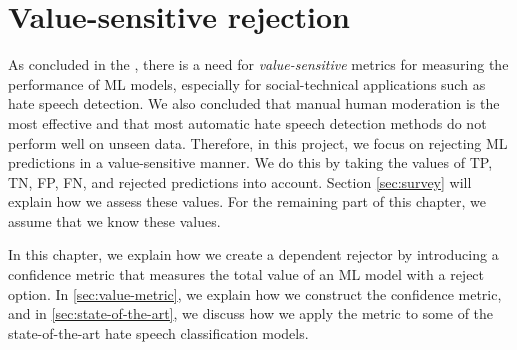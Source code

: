 \chapter{Value-sensitive rejection}
As concluded in the , there is a need for \textit{value-sensitive} metrics for measuring the performance of ML models, especially for social-technical applications such as hate speech detection.
%
We also concluded that manual human moderation is the most effective and that most automatic hate speech detection methods do not perform well on unseen data.
%
Therefore, in this project, we focus on rejecting ML predictions in a value-sensitive manner.
%
We do this by taking the values of TP, TN, FP, FN, and rejected predictions into account.
%
%
Section \ref{sec:survey} will explain how we assess these values.
%
For the remaining part of this chapter, we assume that we know these values.
%

%
In this chapter, we explain how we create a dependent rejector by introducing a confidence metric that measures the total value of an ML model with a reject option.
%
In \ref{sec:value-metric}, we explain how we construct the confidence metric, and in \ref{sec:state-of-the-art}, we discuss how we apply the metric to some of the state-of-the-art hate speech classification models.

